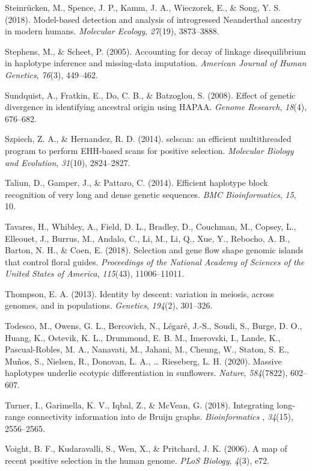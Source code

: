 \documentclass[twocolumn]{bmcart}%
\begin{document}
\begin{backmatter}
Steinrücken, M., Spence, J. P., Kamm, J. A., Wieczorek, E., \& Song, Y.
S. (2018). Model-based detection and analysis of introgressed
Neanderthal ancestry in modern humans. \emph{Molecular Ecology},
\emph{27}(19), 3873--3888.

Stephens, M., \& Scheet, P. (2005). Accounting for decay of linkage
disequilibrium in haplotype inference and missing-data imputation.
\emph{American Journal of Human Genetics}, \emph{76}(3), 449--462.

Sundquist, A., Fratkin, E., Do, C. B., \& Batzoglou, S. (2008). Effect
of genetic divergence in identifying ancestral origin using HAPAA.
\emph{Genome Research}, \emph{18}(4), 676--682.

Szpiech, Z. A., \& Hernandez, R. D. (2014). selscan: an efficient
multithreaded program to perform EHH-based scans for positive selection.
\emph{Molecular Biology and Evolution}, \emph{31}(10), 2824--2827.

Taliun, D., Gamper, J., \& Pattaro, C. (2014). Efficient haplotype block
recognition of very long and dense genetic sequences. \emph{BMC
Bioinformatics}, \emph{15}, 10.

Tavares, H., Whibley, A., Field, D. L., Bradley, D., Couchman, M.,
Copsey, L., Elleouet, J., Burrus, M., Andalo, C., Li, M., Li, Q., Xue,
Y., Rebocho, A. B., Barton, N. H., \& Coen, E. (2018). Selection and
gene flow shape genomic islands that control floral guides.
\emph{Proceedings of the National Academy of Sciences of the United
States of America}, \emph{115}(43), 11006--11011.

Thompson, E. A. (2013). Identity by descent: variation in meiosis,
across genomes, and in populations. \emph{Genetics}, \emph{194}(2),
301--326.

Todesco, M., Owens, G. L., Bercovich, N., Légaré, J.-S., Soudi, S.,
Burge, D. O., Huang, K., Ostevik, K. L., Drummond, E. B. M., Imerovski,
I., Lande, K., Pascual-Robles, M. A., Nanavati, M., Jahani, M., Cheung,
W., Staton, S. E., Muños, S., Nielsen, R., Donovan, L. A., \ldots{}
Rieseberg, L. H. (2020). Massive haplotypes underlie ecotypic
differentiation in sunflowers. \emph{Nature}, \emph{584}(7822),
602--607.

Turner, I., Garimella, K. V., Iqbal, Z., \& McVean, G. (2018).
Integrating long-range connectivity information into de Bruijn graphs.
\emph{Bioinformatics} , \emph{34}(15), 2556--2565.

Voight, B. F., Kudaravalli, S., Wen, X., \& Pritchard, J. K. (2006). A
map of recent positive selection in the human genome. \emph{PLoS
Biology}, \emph{4}(3), e72.


\end{backmatter}
\end{document}
